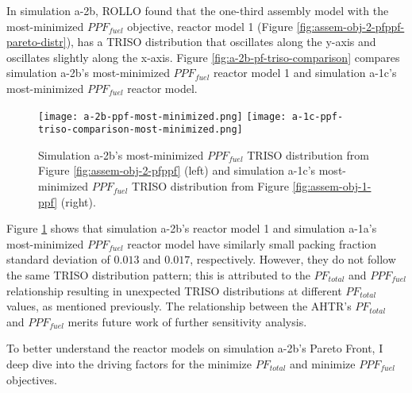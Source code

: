 In simulation a-2b, \gls{ROLLO} found that the one-third assembly model with the 
most-minimized $PPF_{fuel}$ objective, reactor model 1 (Figure 
\ref{fig:assem-obj-2-pfppf-pareto-distr}), has a TRISO distribution that oscillates
along the y-axis and oscillates slightly along the x-axis. 
Figure \ref{fig:a-2b-pf-triso-comparison} compares simulation a-2b's most-minimized 
$PPF_{fuel}$ reactor model 1 and simulation a-1c's most-minimized $PPF_{fuel}$ reactor 
model. 
\begin{figure}[htbp!]
    \centering
    \texttt{[image: a-2b-ppf-most-minimized.png]} 
    \texttt{[image: a-1c-ppf-triso-comparison-most-minimized.png]} 
    \caption{Simulation a-2b's most-minimized $PPF_{fuel}$ TRISO distribution 
    from Figure \ref{fig:assem-obj-2-pfppf} (left) and simulation a-1c's 
    most-minimized $PPF_{fuel}$ TRISO distribution from Figure 
    \ref{fig:assem-obj-1-ppf} (right).}
    \label{fig:a-2b-ppf-triso-comparison}
\end{figure}
Figure \ref{fig:a-2b-ppf-triso-comparison} shows that simulation a-2b's reactor model 1 
and simulation a-1a's most-minimized $PPF_{fuel}$ reactor model have similarly small 
packing fraction standard deviation of $0.013$ and $0.017$, respectively. 
However, they do not follow the same TRISO distribution pattern; this is
attributed to the $PF_{total}$ and $PPF_{fuel}$ relationship resulting in unexpected 
TRISO distributions at different $PF_{total}$ values, as mentioned previously. 
The relationship between the \gls{AHTR}'s $PF_{total}$ and $PPF_{fuel}$ 
merits future work of further sensitivity analysis. 

To better understand the reactor models on simulation a-2b's Pareto Front, I
deep dive into the driving factors for the minimize $PF_{total}$ and minimize 
$PPF_{fuel}$ objectives. 

